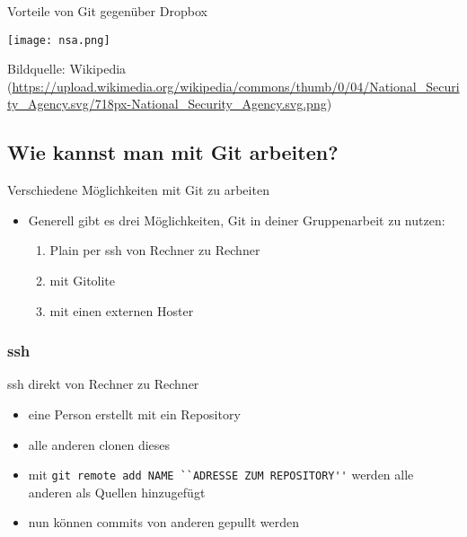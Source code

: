 \documentclass{beamer}
\begin{document}
\begin{frame}{Vorteile von Git gegenüber Dropbox}
	\begin{center}
		\texttt{[image: nsa.png]}
	\end{center}
	{\scriptsize Bildquelle: Wikipedia (\url{https://upload.wikimedia.org/wikipedia/commons/thumb/0/04/National_Security_Agency.svg/718px-National_Security_Agency.svg.png})}
\end{frame}

\subsection{Wie kannst man mit Git arbeiten?}
\begin{frame}{Verschiedene Möglichkeiten mit Git zu arbeiten}
	\begin{itemize}
		\item Generell gibt es drei Möglichkeiten, Git in deiner Gruppenarbeit zu nutzen:
			\begin{enumerate}
				\item Plain per ssh von Rechner zu Rechner
				\item mit Gitolite
				\item mit einen externen Hoster
			\end{enumerate}
	\end{itemize}
\end{frame}

\subsubsection{ssh}
\begin{frame}[fragile]{ssh direkt von Rechner zu Rechner}
	\begin{itemize}
		\item eine Person erstellt mit ein Repository
		\item alle anderen clonen dieses
		\item mit \verb|git remote add NAME ``ADRESSE ZUM REPOSITORY''| werden alle anderen als Quellen hinzugefügt
		\item nun können commits von anderen gepullt werden
	\end{itemize}
\end{frame}
\end{document}
